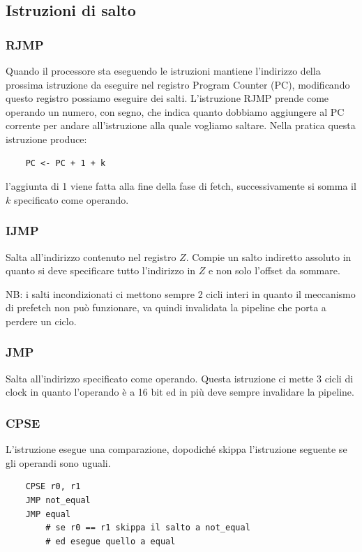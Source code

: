 \subsection{Istruzioni di salto}
\subsubsection{RJMP}
Quando il processore sta eseguendo le istruzioni mantiene l'indirizzo della prossima istruzione da eseguire nel registro Program Counter (PC), modificando questo registro possiamo eseguire dei salti.
L'istruzione RJMP prende come operando un numero, con segno, che indica quanto dobbiamo aggiungere al PC corrente per andare all'istruzione alla quale vogliamo saltare.
Nella pratica questa istruzione produce:
\begin{verbatim}
    PC <- PC + 1 + k
\end{verbatim}
l'aggiunta di 1 viene fatta alla fine della fase di fetch, successivamente si somma il $k$ specificato come operando.

\subsubsection{IJMP}
Salta all'indirizzo contenuto nel registro $Z$.
Compie un salto indiretto assoluto in quanto si deve specificare tutto l'indirizzo in $Z$ e non solo l'offset da sommare.

NB: i salti incondizionati ci mettono sempre 2 cicli interi in quanto il meccanismo di prefetch non può funzionare, va quindi invalidata la pipeline che porta a perdere un ciclo.

\subsubsection{JMP}
Salta all'indirizzo specificato come operando.
Questa istruzione ci mette 3 cicli di clock in quanto l'operando è a 16 bit ed in più deve sempre invalidare la pipeline.

\subsubsection{CPSE}
L'istruzione esegue una comparazione, dopodiché skippa l'istruzione seguente se gli operandi sono uguali.
\begin{verbatim}
    CPSE r0, r1
    JMP not_equal
    JMP equal
        # se r0 == r1 skippa il salto a not_equal
        # ed esegue quello a equal
\end{verbatim}

